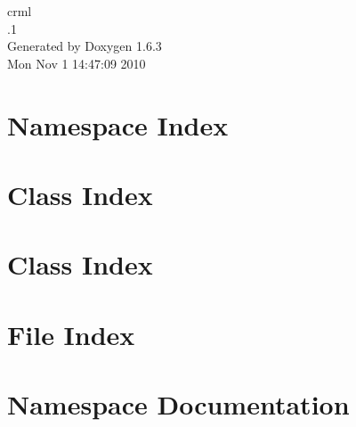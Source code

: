 \documentclass[a4paper]{book}
\begin{document}
\hypersetup{pageanchor=false}
\begin{titlepage}
\vspace*{7cm}
\begin{center}
{\Large crml \\[1ex]\large .1 }\\
\vspace*{1cm}
{\large Generated by Doxygen 1.6.3}\\
\vspace*{0.5cm}
{\small Mon Nov 1 14:47:09 2010}\\
\end{center}
\end{titlepage}
\clearemptydoublepage
{}
\tableofcontents
\clearemptydoublepage
{}
\hypersetup{pageanchor=true}
\chapter{Namespace Index}

\chapter{Class Index}

\chapter{Class Index}

\chapter{File Index}

\chapter{Namespace Documentation}












\end{document}
